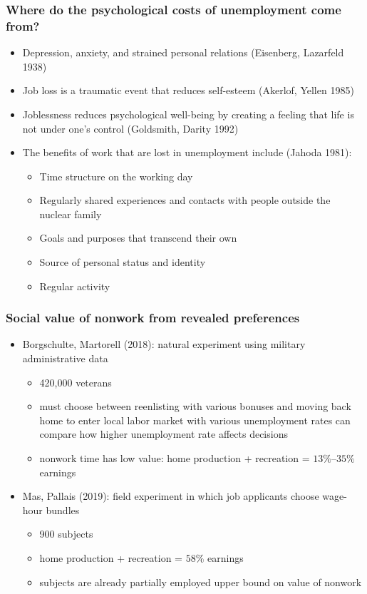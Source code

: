 \documentclass[11pt,aspectratio=169,xcolor={dvipsnames},hyperref={pdftex,pdfpagemode=UseNone,hidelinks,pdfdisplaydoctitle=true},usepdftitle=false]{beamer}
\begin{document}
\begin{frame}
\frametitle{Where do the psychological costs of unemployment come from?}
\begin{itemize}
\item Depression, anxiety, and strained personal relations (Eisenberg, Lazarfeld 1938)
\item Job loss is a traumatic event that reduces self-esteem (Akerlof, Yellen 1985)
\item Joblessness reduces psychological well-being by creating a feeling that life is not under one's control (Goldsmith, Darity 1992)
\item The benefits of work that are lost in unemployment include (Jahoda 1981):
\begin{itemize}
	\item Time structure on the working day
	\item Regularly shared experiences and contacts with people outside the nuclear family
	\item Goals and purposes that transcend their own
	\item Source of personal status and identity
	\item Regular activity
\end{itemize}
\end{itemize}	
\end{frame}

\begin{frame}
\frametitle{Social value of nonwork from revealed preferences}
\begin{itemize}
\item Borgschulte, Martorell (2018): natural experiment using military administrative data
\begin{itemize}
\item 420,000 veterans
\item must choose between reenlisting with various bonuses and moving back home to enter local labor market with various unemployment rates \then can compare how higher unemployment rate affects decisions
\item nonwork time has low value: home production + recreation = $13\%$--$35\%$ earnings
\end{itemize}
\item Mas, Pallais (2019): field experiment in which job applicants choose wage-hour bundles
\begin{itemize}
\item 900 subjects
\item home production + recreation = $58\%$ earnings
\item subjects are already partially employed \then upper bound on value of nonwork
\end{itemize}
\end{itemize}
\end{frame}
\end{document}
